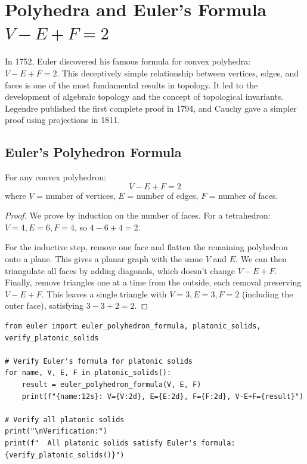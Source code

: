 
\chapter{Polyhedra and Euler's Formula $V - E + F = 2$}

\begin{historical}
In 1752, Euler discovered his famous formula for convex polyhedra: $V - E + F = 2$.
This deceptively simple relationship between vertices, edges, and faces is one of the
most fundamental results in topology. It led to the development of algebraic topology
and the concept of topological invariants. Legendre published the first complete proof
in 1794, and Cauchy gave a simpler proof using projections in 1811. \cite{euler1752}\end{historical}

\section{Euler's Polyhedron Formula}

\begin{theorem}
For any convex polyhedron:
\[
V - E + F = 2
\]
where $V$ = number of vertices, $E$ = number of edges, $F$ = number of faces.
\end{theorem}

\begin{proof}
We prove by induction on the number of faces. For a tetrahedron: $V=4, E=6, F=4$, so $4-6+4=2$.

For the inductive step, remove one face and flatten the remaining polyhedron onto a plane.
This gives a planar graph with the same $V$ and $E$. We can then triangulate all faces by
adding diagonals, which doesn't change $V - E + F$. Finally, remove triangles one at a time
from the outside, each removal preserving $V - E + F$. This leaves a single triangle with
$V=3, E=3, F=2$ (including the outer face), satisfying $3-3+2=2$.
\end{proof}

\begin{lstlisting}[caption={Euler's polyhedron formula}, label=lst:polyhedra]
from euler import euler_polyhedron_formula, platonic_solids, verify_platonic_solids

# Verify Euler's formula for platonic solids
for name, V, E, F in platonic_solids():
    result = euler_polyhedron_formula(V, E, F)
    print(f"{name:12s}: V={V:2d}, E={E:2d}, F={F:2d}, V-E+F={result}")

# Verify all platonic solids
print("\nVerification:")
print(f"  All platonic solids satisfy Euler's formula: {verify_platonic_solids()}")
\end{lstlisting}

